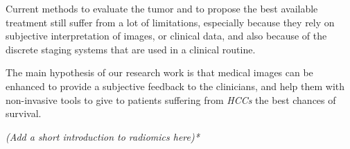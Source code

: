 \documentclass[]{article}
\begin{document}
Current methods to evaluate the tumor and to propose the best available
treatment still suffer from a lot of limitations, especially because
they rely on subjective interpretation of images, or clinical data, and
also because of the discrete staging systems that are used in a clinical
routine.

The main hypothesis of our research work is that medical images can be
enhanced to provide a subjective feedback to the clinicians, and help
them with non-invasive tools to give to patients suffering from
\emph{HCCs} the best chances of survival.

\emph{(Add a short introduction to radiomics here)*}
\end{document}
